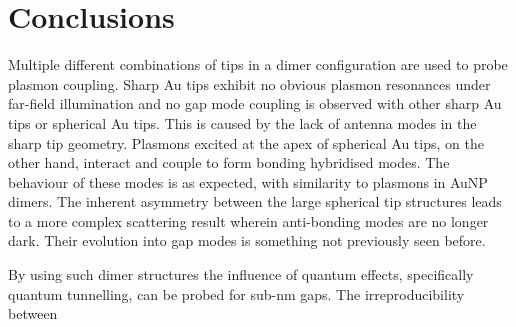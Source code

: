 \documentclass[12pt, a4paper, twoside]{book}
\begin{document}
\section{Conclusions}

Multiple different combinations of tips in a dimer configuration are used to probe plasmon coupling. Sharp Au tips exhibit no obvious plasmon resonances under far-field illumination and no gap mode coupling is observed with other sharp Au tips or spherical Au tips. This is caused by the lack of antenna modes in the sharp tip geometry.
Plasmons excited at the apex of spherical Au tips, on the other hand, interact and couple to form bonding hybridised modes. The behaviour of these modes is as expected, with similarity to plasmons in AuNP dimers. The inherent asymmetry between the large spherical tip structures leads to a more complex scattering result wherein anti-bonding modes are no longer dark. Their evolution into gap modes is something not previously seen before.

By using such dimer structures the influence of quantum effects, specifically quantum tunnelling, can be probed for sub-nm gaps. The irreproducibility between

\ifstandalone
\begin{singlespace}
\fontsize{8pt}{1em}\selectfont
\printbibliography[notcategory=fullcited]
\end{singlespace}
\fi
\end{document}
